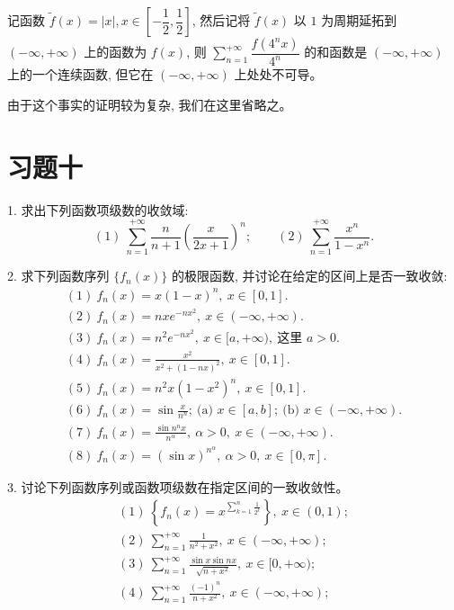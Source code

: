 \documentclass[UTF8, 12pt, fontset=fandol, oneside]{ctexart}
\begin{document}
记函数 $\widetilde f(x)=|x|, x\in\left[-\dfrac12,\dfrac12\right]$, 然后记将 $\widetilde f(x)$ 以 $1$ 为周期延拓到 $(-\infty,+\infty)$ 上的函数为 $f(x)$, 则 $\sum\limits_{n=1}^{+\infty}\dfrac{f(4^n x)}{4^n}$ 的和函数是 $(-\infty,+\infty)$ 上的一个连续函数, 但它在 $(-\infty,+\infty)$ 上处处不可导。

由于这个事实的证明较为复杂, 我们在这里省略之。

\section*{习题十}

1. 求出下列函数项级数的收敛域:
\[
  (1)\ \sum_{n=1}^{+\infty}\frac{n}{n+1}\left(\frac{x}{2x+1}\right)^n;\qquad
  (2)\ \sum_{n=1}^{+\infty}\frac{x^n}{1-x^n}.
\]

2. 求下列函数序列 $\{f_n(x)\}$ 的极限函数, 并讨论在给定的区间上是否一致收敛:
\[
\begin{gathered}
  (1)\ f_n(x)=x(1-x)^n,\ x\in[0,1].\\
  (2)\ f_n(x)=nxe^{-nx^2},\ x\in(-\infty,+\infty).\\
  (3)\ f_n(x)=n^2e^{-nx^2},\ x\in[a,+\infty),\ \text{这里 }a>0.\\
  (4)\ f_n(x)=\frac{x^2}{x^2+(1-nx)^2},\ x\in[0,1].\\
  (5)\ f_n(x)=n^2x(1-x^2)^n,\ x\in[0,1].\\
  (6)\ f_n(x)=\sin\frac{x}{n^n};\ \text{(a) }x\in[a,b];\ \text{(b) }x\in(-\infty,+\infty).\\
  (7)\ f_n(x)=\frac{\sin n^n x}{n^\alpha},\ \alpha>0,\ x\in(-\infty,+\infty).\\
  (8)\ f_n(x)=(\sin x)^{n^\alpha},\ \alpha>0,\ x\in[0,\pi].
\end{gathered}
\]

3. 讨论下列函数序列或函数项级数在指定区间的一致收敛性。
\[
\begin{gathered}
  (1)\ \left\{f_n(x)=x^{\sum_{k=1}^n\frac1{2^k}}\right\},\ x\in(0,1);\\
  (2)\ \sum_{n=1}^{+\infty}\frac1{n^2+x^2},\ x\in(-\infty,+\infty);\\
  (3)\ \sum_{n=1}^{+\infty}\frac{\sin x\sin nx}{\sqrt{n+x^2}},\ x\in[0,+\infty);\\
  (4)\ \sum_{n=1}^{+\infty}\frac{(-1)^n}{n+x^2},\ x\in(-\infty,+\infty);
\end{gathered}
\]
\end{document}
